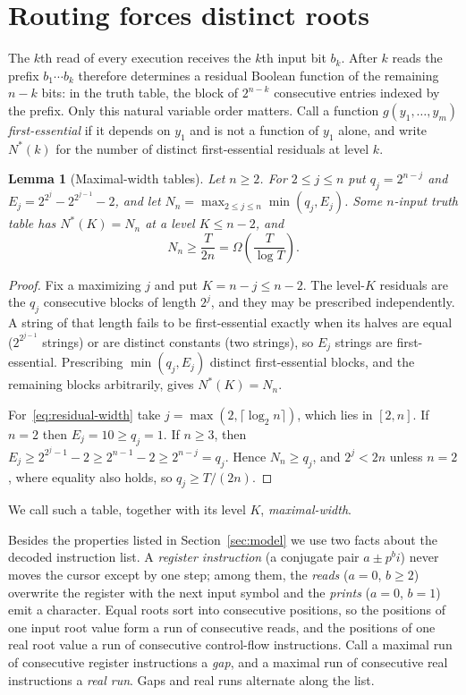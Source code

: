 \documentclass[11pt]{article}
\newtheorem{lemma}[theorem]{Lemma}
\theoremstyle{remark}
\begin{document}
\section{Routing forces distinct roots}\label{sec:routing}

The $k$th read of every execution receives the $k$th input bit $b_k$.  After
$k$ reads the prefix $b_1\cdots b_k$ therefore determines a residual Boolean
function of the remaining $n-k$ bits: in the truth table, the block of
$2^{n-k}$ consecutive entries indexed by the prefix.  Only this natural
variable order matters.  Call a function $g(y_1,\ldots,y_m)$
\emph{first-essential} if it depends on $y_1$ and is not a function of $y_1$
alone, and write $N^*(k)$ for the number of distinct first-essential
residuals at level $k$.

\begin{lemma}[Maximal-width tables]\label{lem:maximal-width}
Let $n\ge2$.  For $2\le j\le n$ put $q_j=2^{n-j}$ and
$E_j=2^{2^j}-2^{2^{j-1}}-2$, and let
$N_n=\max_{2\le j\le n}\min(q_j,E_j)$.  Some $n$-input truth table has
$N^*(K)=N_n$ at a level $K\le n-2$, and
\begin{equation}\label{eq:residual-width}
  N_n\ge\frac{T}{2n}=\Omega\!\left(\frac{T}{\log T}\right).
\end{equation}
\end{lemma}

\begin{proof}
Fix a maximizing $j$ and put $K=n-j\le n-2$.  The level-$K$ residuals are
the $q_j$ consecutive blocks of length $2^j$, and they may be prescribed
independently.  A string of that length fails to be first-essential exactly
when its halves are equal ($2^{2^{j-1}}$ strings) or are distinct constants
(two strings), so $E_j$ strings are first-essential.  Prescribing
$\min(q_j,E_j)$ distinct first-essential blocks, and the remaining blocks
arbitrarily, gives $N^*(K)=N_n$.

For~\eqref{eq:residual-width} take
$j=\max(2,\lceil\log_2n\rceil)$, which lies in $[2,n]$.  If $n=2$ then
$E_j=10\ge q_j=1$.  If $n\ge3$, then
$E_j\ge2^{2^j-1}-2\ge2^{n-1}-2\ge2^{n-j}=q_j$.  Hence
$N_n\ge q_j$, and $2^j<2n$ unless $n=2$, where equality also holds, so
$q_j\ge T/(2n)$.
\end{proof}

We call such a table, together with its level $K$, \emph{maximal-width}.

Besides the properties listed in Section~\ref{sec:model} we use two facts about the
decoded instruction list.  A \emph{register instruction} (a conjugate pair
$a\pm p^bi$) never moves the cursor except by one step; among them, the
\emph{reads} ($a=0$, $b\ge2$) overwrite the register with the next input
symbol and the \emph{prints} ($a=0$, $b=1$) emit a character.  Equal roots
sort into consecutive positions, so the positions of one input root value
form a run of consecutive reads, and the positions of one real root value a
run of consecutive control-flow instructions.  Call a maximal run of
consecutive register instructions a \emph{gap}, and a maximal run of
consecutive real instructions a \emph{real run}.  Gaps and real runs
alternate along the list.
\end{document}
